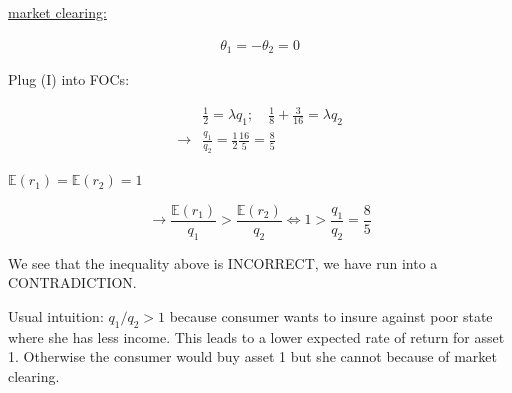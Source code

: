 {{\begin{enumerate}[label=(\roman*)]
{\underline{market clearing:}

\begin{align*}
    \theta_{1}=-\theta_{2}=0 \tag{I}
\end{align*}

Plug (I) into FOCs:

$$
\begin{aligned}
& \frac{1}{2}=\lambda q_{1} ; \quad \frac{1}{8}+\frac{3}{16}=\lambda q_{2} \\
\longrightarrow & \frac{q_{1}}{q_{2}}=\frac{1}{2} \frac{16}{5}=\frac{8}{5}
\end{aligned}
$$
}
{
\item 

$\mathbb{E}\left(r_{1}\right)=\mathbb{E}\left(r_{2}\right)=1$

$$
\longrightarrow \frac{\mathbb{E}\left(r_{1}\right)}{q_{1}}>\frac{\mathbb{E}\left(r_{2}\right)}{q_{2}} \Longleftrightarrow 1>\frac{q_{1}}{q_{2}}=\frac{8}{5}
$$

We see that the inequality above is INCORRECT, we have run into a CONTRADICTION.

Usual intuition: $q_{1} / q_{2}>1$ because consumer wants to insure against poor state where she has less income. This leads to a lower expected rate of return for asset 1. Otherwise the consumer would buy asset 1 but she cannot because of market clearing.
}
\end{enumerate}
}
}